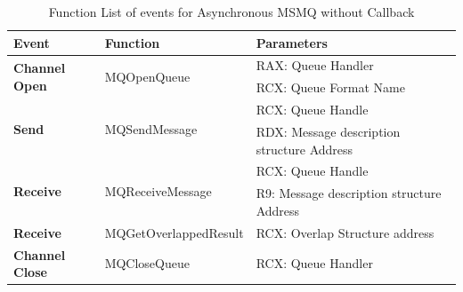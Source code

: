     \begin{table}[H]
        \centering
        \caption{Function List  of events for Asynchronous MSMQ without Callback}
        \label{msmqasynfunctions}
        \begin{tabular}{|l|l|l|}
            \hline
             \textbf{Event} & \textbf{Function}& \textbf{Parameters}  \\
             \hline
             \multirow{2}{*}{{\textbf{Channel Open}}}
             &\multirow{2}{*}{{MQOpenQueue}} &  RAX: Queue Handler\\
              \cline{3-3} 
             & &  RCX: Queue Format Name\\
            \hline
             \multirow{2}{*}{{\textbf{Send}}}
             &\multirow{2}{*}{MQSendMessage} &  RCX: Queue Handle \\
              \cline{3-3} 
             &&  RDX: Message description structure Address \\
            \hline
             \multirow{2}{*}{{\textbf{Receive}}}
             & \multirow{2}{*}{MQReceiveMessage}&  RCX: Queue Handle \\
              \cline{3-3} 
              &&  R9: Message description structure Address \\
              \hline
              \textbf{Receive} 
              & MQGetOverlappedResult &  RCX: Overlap Structure address  \\
            \hline
            \textbf{Channel Close} &MQCloseQueue & RCX: Queue Handler \\
            \hline
        \end{tabular}
    \end{table}
    

    
